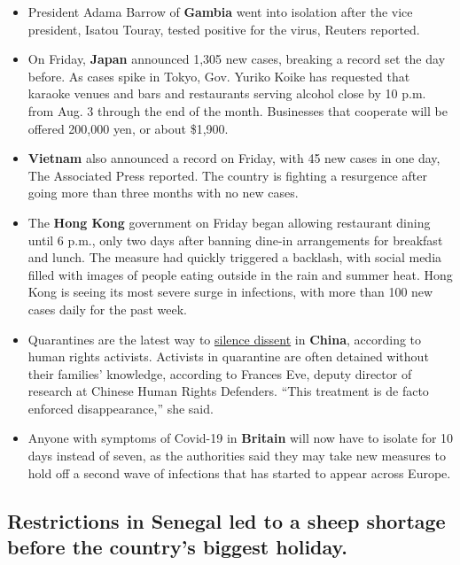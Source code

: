 \begin{itemize}
\item
  President Adama Barrow of \textbf{Gambia} went into isolation after
  the vice president, Isatou Touray, tested positive for the virus,
  Reuters reported.
\item
  On Friday, \textbf{Japan} announced 1,305 new cases, breaking a record
  set the day before. As cases spike in Tokyo, Gov. Yuriko Koike has
  requested that karaoke venues and bars and restaurants serving alcohol
  close by 10 p.m. from Aug. 3 through the end of the month. Businesses
  that cooperate will be offered 200,000 yen, or about \$1,900.
\item
  \textbf{Vietnam} also announced a record on Friday, with 45 new cases
  in one day, The Associated Press reported. The country is fighting a
  resurgence after going more than three months with no new cases.
\item
  The \textbf{Hong Kong} government on Friday began allowing restaurant
  dining until 6 p.m., only two days after banning dine-in arrangements
  for breakfast and lunch. The measure had quickly triggered a backlash,
  with social media filled with images of people eating outside in the
  rain and summer heat. Hong Kong is seeing its most severe surge in
  infections, with more than 100 new cases daily for the past week.
\item
  Quarantines are the latest way to
  \href{https://www.nytimes.com/2020/07/30/world/asia/coronavirus-china-qurantine.html}{silence
  dissent} in \textbf{China}, according to human rights activists.
  Activists in quarantine are often detained without their families'
  knowledge, according to Frances Eve, deputy director of research at
  Chinese Human Rights Defenders. ``This treatment is de facto enforced
  disappearance,'' she said.
\item
  Anyone with symptoms of Covid-19 in \textbf{Britain} will now have to
  isolate for 10 days instead of seven, as the authorities said they may
  take new measures to hold off a second wave of infections that has
  started to appear across Europe.
\end{itemize}

\hypertarget{restrictions-in-senegal-led-to-a-sheep-shortage-before-the-countrys-biggest-holiday}{%
\subsection{Restrictions in Senegal led to a sheep shortage before the
country's biggest
holiday.}\label{restrictions-in-senegal-led-to-a-sheep-shortage-before-the-countrys-biggest-holiday}}

